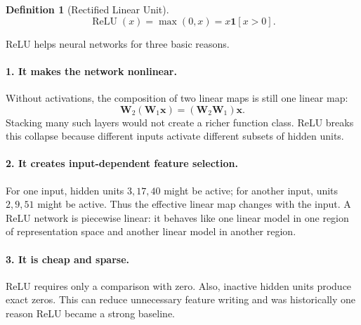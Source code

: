 \documentclass[11pt,a4paper]{article}
\theoremstyle{definition}
\newtheorem{definition}{Definition}[section]
\theoremstyle{plain}
\newcommand{\vx}{\bm{x}}
\newcommand{\mW}{\bm{W}}
\newcommand{\ind}{\mathbf{1}}
\DeclareMathOperator{\ReLU}{ReLU}
\begin{document}
\begin{definition}[Rectified Linear Unit]
\begin{equation}
    \ReLU(x)=\max(0,x)=x\ind[x>0].
\end{equation}
\end{definition}

ReLU helps neural networks for three basic reasons.

\paragraph{1. It makes the network nonlinear.}
Without activations, the composition of two linear maps is still one linear map:
\begin{equation}
    \mW_2(\mW_1\vx)=(\mW_2\mW_1)\vx.
\end{equation}
Stacking many such layers would not create a richer function class. ReLU breaks this collapse because different inputs activate different subsets of hidden units.

\paragraph{2. It creates input-dependent feature selection.}
For one input, hidden units $3,17,40$ might be active; for another input, units $2,9,51$ might be active. Thus the effective linear map changes with the input. A ReLU network is piecewise linear: it behaves like one linear model in one region of representation space and another linear model in another region.

\paragraph{3. It is cheap and sparse.}
ReLU requires only a comparison with zero. Also, inactive hidden units produce exact zeros. This can reduce unnecessary feature writing and was historically one reason ReLU became a strong baseline.
\end{document}
